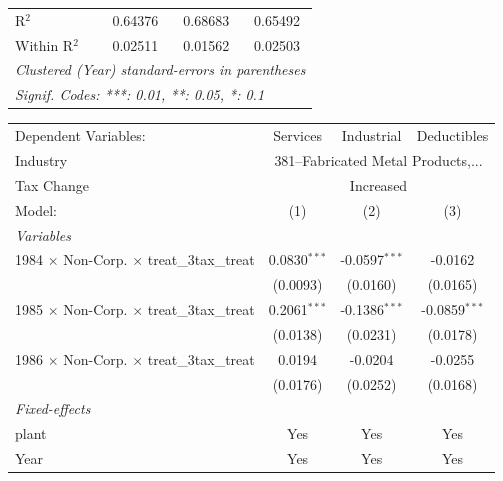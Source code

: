 \documentclass[
  12pt]{article}
\theoremstyle{definition}
\theoremstyle{remark}
\begin{document}
\begin{table}
\begin{minipage}{\linewidth}
\begin{tabular}{lccc}
   R$^2$                                                   & 0.64376         & 0.68683    & 0.65492\\  
   Within R$^2$                                            & 0.02511         & 0.01562    & 0.02503\\  
   \midrule \midrule
   \multicolumn{4}{l}{\emph{Clustered (Year) standard-errors in parentheses}}\\
   \multicolumn{4}{l}{\emph{Signif. Codes: ***: 0.01, **: 0.05, *: 0.1}}\\
\end{tabular}
\par\endgroup
\begingroup
\centering
\begin{tabular}{lccc}
   \tabularnewline \midrule \midrule
   Dependent Variables:                                    & Services       & Industrial      & Deductibles\\  
   Industry & \multicolumn{3}{c}{381–Fabricated Metal Products,...} \\ 
   Tax Change & \multicolumn{3}{c}{Increased} \\ 
   Model:                                                  & (1)            & (2)             & (3)\\  
   \midrule
   \emph{Variables}\\
   1984 $\times$ Non-Corp. $\times$ treat\_3tax\_treat     & 0.0830$^{***}$ & -0.0597$^{***}$ & -0.0162\\   
                                                           & (0.0093)       & (0.0160)        & (0.0165)\\   
   1985 $\times$ Non-Corp. $\times$ treat\_3tax\_treat     & 0.2061$^{***}$ & -0.1386$^{***}$ & -0.0859$^{***}$\\   
                                                           & (0.0138)       & (0.0231)        & (0.0178)\\   
   1986 $\times$ Non-Corp. $\times$ treat\_3tax\_treat     & 0.0194         & -0.0204         & -0.0255\\   
                                                           & (0.0176)       & (0.0252)        & (0.0168)\\   
   \midrule
   \emph{Fixed-effects}\\
   plant                                                   & Yes            & Yes             & Yes\\  
   Year                                                    & Yes            & Yes             & Yes\\  

\end{tabular}
\end{minipage}
\end{table}
\end{document}
